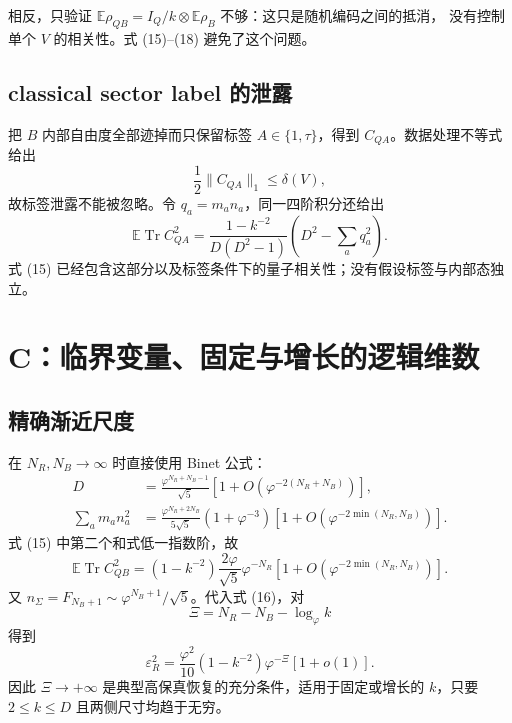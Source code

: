 \documentclass[UTF8,11pt,a4paper]{ctexart}
\theoremstyle{definition}
\newcommand{\Tr}{\operatorname{Tr}}
\newcommand{\E}{\mathbb E}
\newcommand{\norm}[1]{\lVert #1\rVert}
\newcommand{\phiG}{\varphi}
\begin{document}
相反，只验证 $\E\rho_{QB}=I_Q/k\otimes\E\rho_B$ 不够：这只是随机编码之间的抵消，
没有控制单个 $V$ 的相关性。式 (15)--(18) 避免了这个问题。

\subsection{classical sector label 的泄露}

把 $B$ 内部自由度全部迹掉而只保留标签 $A\in\{1,\tau\}$，得到
$C_{QA}$。数据处理不等式给出
\begin{equation}
\frac12\norm{C_{QA}}_1\le\delta(V),                               \tag{19}
\end{equation}
故标签泄露不能被忽略。令 $q_a=m_an_a$，同一四阶积分还给出
\begin{equation}
\E\Tr C_{QA}^2=
\frac{1-k^{-2}}{D(D^2-1)}\left(D^2-\sum_aq_a^2\right).             \tag{20}
\end{equation}
式 (15) 已经包含这部分以及标签条件下的量子相关性；没有假设标签与内部态独立。

\section{C：临界变量、固定与增长的逻辑维数}

\subsection{精确渐近尺度}

在 $N_R,N_B\to\infty$ 时直接使用 Binet 公式：
\begin{align*}
D&=\frac{\phiG^{N_R+N_B-1}}{\sqrt5}
 [1+O(\phiG^{-2(N_R+N_B)})],\\
\sum_am_an_a^2
&=\frac{\phiG^{N_R+2N_B}}{5\sqrt5}(1+\phiG^{-3})
 [1+O(\phiG^{-2\min(N_R,N_B)})].
\end{align*}
式 (15) 中第二个和式低一指数阶，故
\begin{equation}
\E\Tr C_{QB}^2=
(1-k^{-2})\frac{2\phiG}{\sqrt5}\phiG^{-N_R}
[1+O(\phiG^{-2\min(N_R,N_B)})].                                   \tag{21}
\end{equation}
又 $n_\Sigma=F_{N_B+1}\sim\phiG^{N_B+1}/\sqrt5$。代入式 (16)，对
\[
\Xi=N_R-N_B-\log_{\phiG}k
\]
得到
\begin{equation}
\boxed{\varepsilon_R^2=
\frac{\phiG^2}{10}(1-k^{-2})\phiG^{-\Xi}[1+o(1)].}                 \tag{22}
\end{equation}
因此 $\Xi\to+\infty$ 是典型高保真恢复的充分条件，适用于固定或增长的 $k$，只要
$2\le k\le D$ 且两侧尺寸均趋于无穷。
\end{document}
